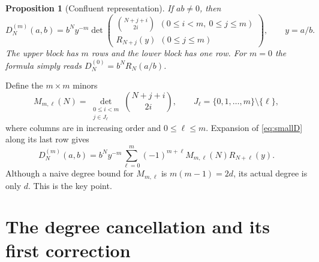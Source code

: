 \documentclass[11pt,a4paper]{article}
\numberwithin{equation}{section}
\newtheorem{proposition}[theorem]{Proposition}
\theoremstyle{definition}
\theoremstyle{remark}
\newcommand{\D}[2]{D_{#1}^{(#2)}}
\begin{document}
\begin{proposition}[Confluent representation]\label{prop:confluent}
If $ab\ne0$, then
\begin{equation}\label{eq:smallD}
 \D{N}{m}(a,b)=b^Ny^{-m}
 \det\begin{pmatrix}
 \binom{N+j+i}{2i}\ \ (0\leq i<m,\ 0\leq j\leq m)\\[2pt]
 R_{N+j}(y)\ \ (0\leq j\leq m)
 \end{pmatrix},\qquad y=a/b.
\end{equation}
The upper block has $m$ rows and the lower block has one row.  For $m=0$
the formula simply reads $D_N^{(0)}=b^NR_N(a/b)$.
\end{proposition}

Define the $m\times m$ minors
\begin{equation}\label{eq:M}
 M_{m,\ell}(N)=
 \det_{\substack{0\leq i<m\\j\in J_\ell}}
       \binom{N+j+i}{2i},\qquad
 J_\ell=\{0,1,\ldots,m\}\setminus\{\ell\},
\end{equation}
where columns are in increasing order and $0\leq\ell\leq m$.
Expansion of \eqref{eq:smallD} along its last row gives
\begin{equation}\label{eq:minor-expansion}
 \D{N}{m}(a,b)=b^Ny^{-m}
 \sum_{\ell=0}^{m}(-1)^{m+\ell}M_{m,\ell}(N)R_{N+\ell}(y).
\end{equation}
Although a naive degree bound for $M_{m,\ell}$ is $m(m-1)=2d$, its
actual degree is only $d$.  This is the key point.

\section{The degree cancellation and its first correction}\label{sec:degree}
\end{document}
